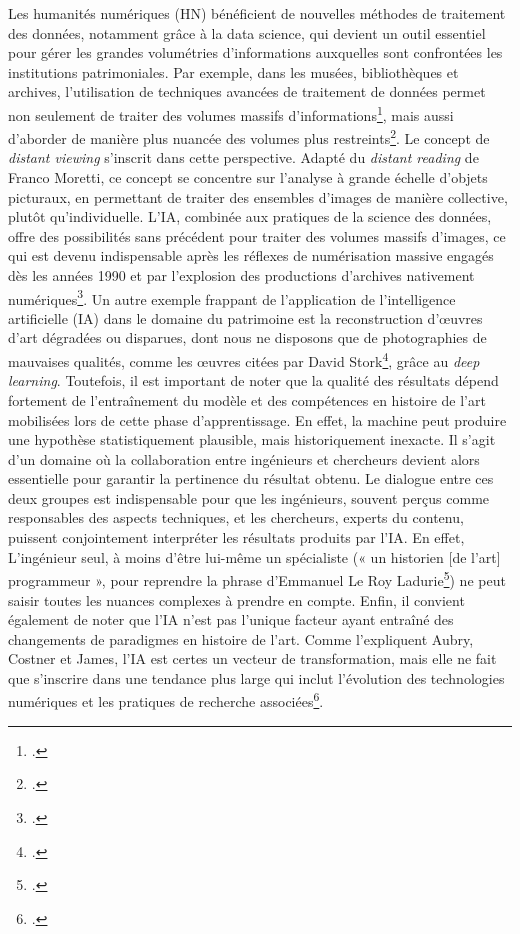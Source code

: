 Les humanités numériques (HN) bénéficient de nouvelles méthodes de traitement des données, notamment grâce à la data science, qui devient un outil essentiel pour gérer les grandes volumétries d’informations auxquelles sont confrontées les institutions patrimoniales. Par exemple, dans les musées, bibliothèques et archives, l’utilisation de techniques avancées de traitement de données permet non seulement de traiter des volumes massifs d’informations\footcite{bermes_patrimoine_2020}, mais aussi d’aborder de manière plus nuancée des volumes plus restreints\footcite[p.29]{manovich_data_2015}. 
Le concept de \textit{distant viewing} s’inscrit dans cette perspective. Adapté du \textit{distant reading} de Franco Moretti, ce concept se concentre sur l'analyse à grande échelle d'objets picturaux, en permettant de traiter des ensembles d’images de manière collective, plutôt qu’individuelle. L’IA, combinée aux pratiques de la science des données, offre des possibilités sans précédent pour traiter des volumes massifs d’images, ce qui est devenu indispensable après les réflexes de numérisation massive engagés dès les années 1990 et par l’explosion des productions d’archives nativement numériques\footcite{arnold_distant_2019}.
Un autre exemple frappant de l'application de l'intelligence artificielle (IA) dans le domaine du patrimoine est la reconstruction d'œuvres d'art dégradées ou disparues, dont nous ne disposons que de photographies de mauvaises qualités, comme les œuvres citées par David Stork\footcite[p.685-87]{stork_how_2023}, grâce au \textit{deep learning}. Toutefois, il est important de noter que la qualité des résultats dépend fortement de l'entraînement du modèle et des compétences en histoire de l'art mobilisées lors de cette phase d’apprentissage. En effet, la machine peut produire une hypothèse statistiquement plausible, mais historiquement inexacte. Il s'agit d'un domaine où la collaboration entre ingénieurs et chercheurs devient alors essentielle pour garantir la pertinence du résultat obtenu. Le dialogue entre ces deux groupes est indispensable pour que les ingénieurs, souvent perçus comme responsables des aspects techniques, et les chercheurs, experts du contenu, puissent conjointement interpréter les résultats produits par l’IA. En effet, L’ingénieur seul, à moins d’être lui-même un spécialiste (« un historien [de l’art] programmeur », pour reprendre la phrase d’Emmanuel Le Roy Ladurie\footcite{lemny__2017}) ne peut saisir toutes les nuances complexes à prendre en compte.
Enfin, il convient également de noter que l'IA n'est pas l'unique facteur ayant entraîné des changements de paradigmes en histoire de l'art. Comme l'expliquent Aubry, Costner et James, l'IA est certes un vecteur de transformation, mais elle ne fait que s’inscrire dans une tendance plus large qui inclut l’évolution des technologies numériques et les pratiques de recherche associées\footcite[p.59]{aubry_artificial_2021}.

